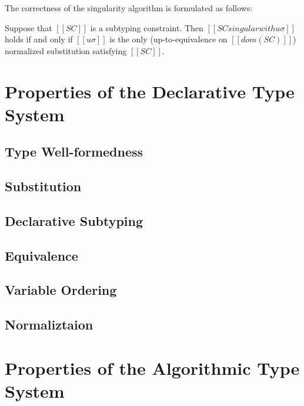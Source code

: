 \documentclass[a4,natbib=false]{article}
\newcommand{\genDir}{_gen}
\begin{document}
The correctness of the singularity algorithm is formulated as follows:
\begin{theorempreview}
  Suppose that $[[SC]]$ is a subtyping constraint.
  Then $[[SC singular with uσ]]$ holds if and only if 
  $[[uσ]]$ is the only (up-to-equivalence on $[[dom(SC)]]$) 
  normalized substitution satisfying $[[SC]]$.
\end{theorempreview}


\newpage

\section{Properties of the Declarative Type System}

\subsection{Type Well-formedness}


\subsection{Substitution}


\subsection{Declarative Subtyping}


\subsection{Equivalence}
\label{sec:decl-equiv-lemmas}


\subsection{Variable Ordering}



\subsection{Normaliztaion}



\section{Properties of the Algorithmic Type System}
\end{document}
